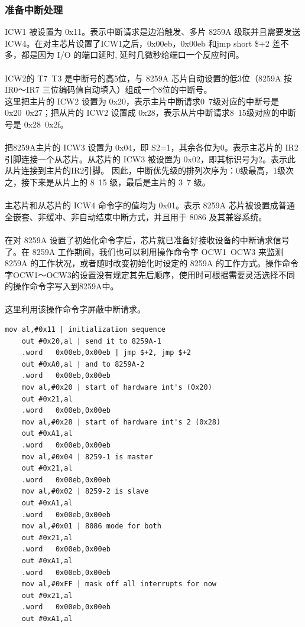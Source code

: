 \documentclass[12pt]{article}
\begin{document}
\subsubsection{准备中断处理}
ICW1 被设置为 0x11。表示中断请求是边沿触发、多片 8259A 级联并且需要发送 ICW4。在对主芯片设置了ICW1之后，0x00eb，0x00eb 和jmp short \$+2 差不多，都是因为 I/O 的端口延时, 延时几微秒给端口一个反应时间。\\\\
ICW2的 T7~T3 是中断号的高5位，与 8259A 芯片自动设置的低3位（8259A 按 IR0～IR7 三位编码值自动填入）组成一个8位的中断号。\\
这里把主片的 ICW2 设置为 0x20，表示主片中断请求0~7级对应的中断号是 0x20~0x27；把从片的 ICW2 设置成 0x28，表示从片中断请求8~15级对应的中断号是 0x28~0x2f。 \\\\
把8259A主片的 ICW3 设置为 0x04，即 S2=1，其余各位为0。表示主芯片的 IR2 引脚连接一个从芯片。从芯片的 ICW3 被设置为 0x02，即其标识号为2。表示此从片连接到主片的IR2引脚。 因此，中断优先级的排列次序为：0级最高，1级次之，接下来是从片上的 8~15 级，最后是主片的 3~7 级。 \\\\
主芯片和从芯片的 ICW4 命令字的值均为 0x01。表示 8259A 芯片被设置成普通全嵌套、非缓冲、非自动结束中断方式，并且用于 8086 及其兼容系统。\\\\
在对 8259A 设置了初始化命令字后，芯片就已准备好接收设备的中断请求信号了。在 8259A 工作期间，我们也可以利用操作命令字 OCW1~OCW3 来监测 8259A 的工作状况，或者随时改变初始化时设定的 8259A 的工作方式。操作命令字OCW1～OCW3的设置没有规定其先后顺序，使用时可根据需要灵活选择不同的操作命令字写入到8259A中。\\\\
这里利用该操作命令字屏蔽中断请求。
\begin{lstlisting}[breaklines]
	mov	al,#0x11 | initialization sequence
	out	#0x20,al | send it to 8259A-1
	.word	0x00eb,0x00eb | jmp $+2, jmp $+2
	out	#0xA0,al | and to 8259A-2
	.word	0x00eb,0x00eb
	mov	al,#0x20 | start of hardware int's (0x20)
	out	#0x21,al
	.word	0x00eb,0x00eb
	mov	al,#0x28 | start of hardware int's 2 (0x28)
	out	#0xA1,al
	.word	0x00eb,0x00eb
	mov	al,#0x04 | 8259-1 is master
	out	#0x21,al
	.word	0x00eb,0x00eb
	mov	al,#0x02 | 8259-2 is slave
	out	#0xA1,al
	.word	0x00eb,0x00eb
	mov	al,#0x01 | 8086 mode for both
	out	#0x21,al
	.word	0x00eb,0x00eb
	out	#0xA1,al
	.word	0x00eb,0x00eb
	mov	al,#0xFF | mask off all interrupts for now
	out	#0x21,al
	.word	0x00eb,0x00eb
	out	#0xA1,al
\end{lstlisting}	
\end{document}
